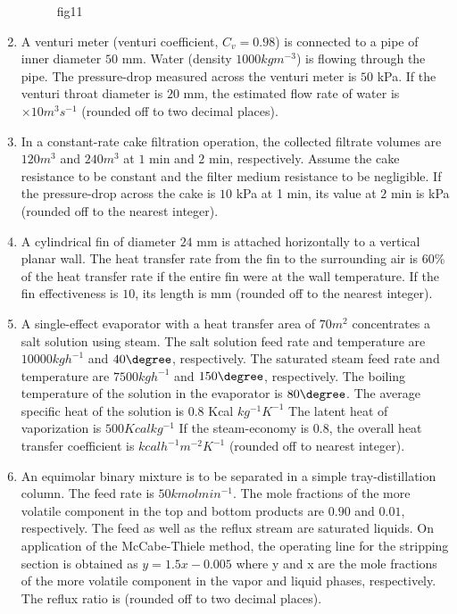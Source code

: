 \documentclass[journal]{IEEEtran}
\numberwithin{equation}{enumi}
\numberwithin{figure}{enumi}
\begin{document}
\begin{enumerate}[start=1, label={Q\arabic*.}]
\begin{figure}[H]
    \caption{fig11}
    \label{fig:11}
\end{figure}
\item A venturi meter (venturi coefficient, $C_v = 0.98$) is connected to a pipe of inner diameter $50$ mm. Water (density $1000 kg m^{-3}$) is flowing through the pipe. The pressure-drop measured across the venturi meter is $50$ kPa. If the venturi throat diameter is $20$ mm, the estimated flow rate of water is \underline{\hspace{1.5cm}}$\times 10 m^3 s^{-1}$ (rounded off to two decimal places).
\vspace{0.2cm}
\item In a constant-rate cake filtration operation, the collected filtrate volumes are $120 m^3$ and $240 m^3$ at $1$ min and $2$ min, respectively. Assume the cake resistance to be constant and the filter medium resistance to be negligible. If the pressure-drop across the cake is $10$ kPa at 1 min, its value at $2$ min is \underline{\hspace{1.5cm}}kPa (rounded off to the nearest integer).
\vspace{0.2cm}
\item A cylindrical fin of diameter $24$ mm is attached horizontally to a vertical planar wall. The heat transfer rate from the fin to the surrounding air is $60\%$ of the heat transfer rate if the entire fin were at the wall temperature. If the fin effectiveness is $10$, its length is \underline{\hspace{1.5cm}}mm (rounded off to the nearest integer).
\vspace{0.2cm}
\item A single-effect evaporator with a heat transfer area of $70m^2$ concentrates a salt solution using steam. The salt solution feed rate and temperature are $10000kg h ^ {- 1}$ and $40\degree$, respectively. The saturated steam feed rate and temperature are $7500 kg  h ^ {- 1}$ and $150\degree$, respectively. The boiling temperature of the solution in the evaporator is $80\degree$. The average specific heat of the solution is $0.8$ Kcal $kg^ {- 1} K ^ {- 1}$ The latent heat of vaporization is $500 Kcal kg ^ {- 1}$ If the steam-economy is $0.8$, the overall heat transfer coefficient is \underline{\hspace{1.5cm}} $kcal h^{-1}m^{-2}K^{- 1}$ (rounded off to nearest integer).
\newpage
\item An equimolar binary mixture is to be separated in a simple tray-distillation column. The feed rate is $50 k mol min^{-1}$. The mole fractions of the more volatile component in the top and bottom products are $0.90$ and $0.01$, respectively. The feed as well as the reflux stream are saturated liquids. On application of the McCabe-Thiele method, the operating line for the stripping section is obtained as $y = 1.5x - 0.005$ where y and x are the mole fractions of the more volatile component in the vapor and liquid phases, respectively. The reflux ratio is \underline{\hspace{1.5cm}} (rounded off to two decimal places).

\end{enumerate}
\end{document}
